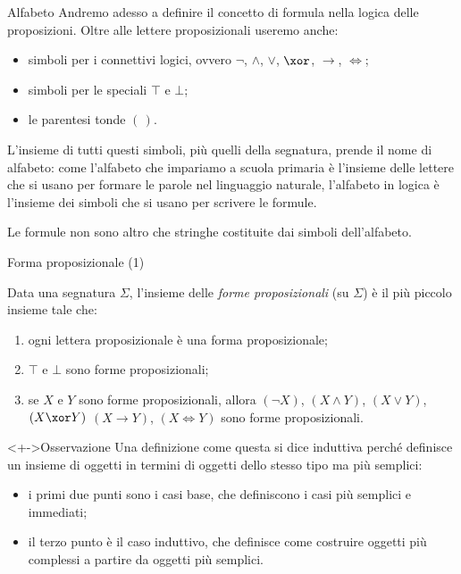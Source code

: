 \documentclass[aspectratio=169,10pt,dvipsnames,xcolor=table,handout]{beamer}
\begin{document}
\begin{frame}{Alfabeto}
    Andremo adesso a definire il concetto di formula nella logica delle proposizioni. Oltre alle lettere proposizionali useremo anche:
    \begin{itemize}
        \item simboli per i connettivi logici, ovvero $\neg$, $\land$, $\lor$, $\xor$, $\to$, $\iff$;
        \item simboli per le \fp speciali $\top$ e $\bot$;
        \item le parentesi tonde $(\,)$.
    \end{itemize}
    L'insieme di tutti questi simboli, più quelli della segnatura, prende il nome di \alert{alfabeto}: come l'alfabeto che impariamo a scuola primaria è l'insieme delle lettere che si usano per formare le parole nel linguaggio naturale, l'alfabeto in logica è l'insieme dei simboli che si usano per scrivere le formule.

    \medskip
    Le formule non sono altro che stringhe costituite dai simboli dell'alfabeto.
\end{frame}

\begin{frame}{Forma proposizionale (1)}

    \begin{definition}
        Data una segnatura $\Sigma$, l'insieme delle \emph{forme proposizionali} (su $\Sigma$) è il più piccolo insieme tale che:
        \begin{enumerate}[<+->]
            \item ogni lettera proposizionale è una forma proposizionale;
            \item $\top$ e $\bot$ sono forme proposizionali;
            \item se $X$ e $Y$ sono forme proposizionali, allora $(\neg X)$, $(X \land Y)$, $(X \lor Y)$, $(X \xor Y)$ $(X \to Y)$, $(X \iff Y)$ sono forme proposizionali.
        \end{enumerate}
    \end{definition}

    \begin{block}<+->{Osservazione}
        Una definizione come questa si dice \alert{induttiva} perché definisce un insieme di oggetti in termini di oggetti dello stesso tipo ma più semplici:
        \begin{itemize}[<+->]
            \item i primi due punti sono i \alert{casi base}, che definiscono i casi più semplici e immediati;
            \item il terzo punto è il \alert{caso induttivo}, che definisce come costruire oggetti più complessi a partire da oggetti più semplici.
        \end{itemize}
    \end{block}

\end{frame}
\end{document}
